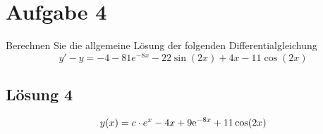 \documentclass[main.tex]{subfiles}
\begin{document}
\section{Aufgabe 4}
Berechnen Sie die allgemeine Lösung der folgenden Differentialgleichung
\[
y' - y = -4 - 81e^{-8x} - 22\sin(2x) + 4x - 11\cos(2x)
\]

\subsection{Lösung 4}
\[
    y(x) = c\cdot e^x - 4 x + 9 \mathrm{e}^{-8x} + 11 \cos (2x)
\]
\end{document}
